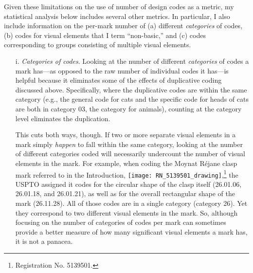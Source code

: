 \documentclass[letterpaper, 11pt, oneside]{article}
\begin{document}
Given these limitations on the use of number of design codes as a metric, my statistical analysis below includes several other metrics. In particular, I also include information on the per-mark number of (a) different \emph{categories} of codes, (b) codes for visual elements that I term ``non-basic,'' and (c) codes corresponding to groups consisting of multiple visual elements.

\begin{enumerate}

\item[i.] \textit{Categories of codes}. Looking at the number of different \emph{categories} of codes a mark has—as opposed to the raw number of individual codes it has—is helpful because it eliminates some of the effects of duplicative coding discussed above. Specifically, where the duplicative codes are within the same category (e.g., the general code for cats and the specific code for heads of cats are both in category 03, the category for animals), counting at the category level eliminates the duplication.

This cuts both ways, though. If two or more separate visual elements in a mark simply \emph{happen} to fall within the same category, looking at the number of different categories coded will necessarily undercount the number of visual elements in the mark. For example, when coding the Moynat Réjane clasp mark referred to in the Introduction, \texttt{[image: RN\_5139501\_drawing]},\footnote{Registration No. 5139501.} the USPTO assigned it codes for the circular shape of the clasp itself (26.01.06, 26.01.18, and 26.01.21), as well as for the overall rectangular shape of the mark (26.11.28). All of those codes are in a single category (category 26). Yet they correspond to two different visual elements in the mark. So, although focusing on the number of categories of codes per mark can sometimes provide a better measure of how many significant visual elements a mark has, it is not a panacea.


\end{enumerate}
\end{document}
